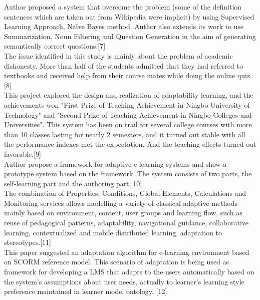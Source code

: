 Author  proposed a system that overcome the problem (some of the definition sentences which are taken out from Wikipedia were implicit) by using Supervised Learning Approach, Naïve Bayes method. Author also extends its work to use Summarization, Noun Filtering and Question Generation in the aim of generating semantically correct questions.[7]\\[0.5cm]
The issue identified in this study is mainly about the problem of academic dishonesty. More than half of the students admitted that they had referred to textbooks and received help from their course mates while doing the online quiz.[8]\\[0.5cm]
This project explored the design and realization of adaptability learning, and the achievements won "First Prize of Teaching Achievement in Ningbo University of Technology" and "Second Prize of Teaching Achievement in Ningbo Colleges and Universities". This system has been on trail for several college courses with more than 10 classes lasting for nearly 2 semesters, and it turned out stable with all the performance indexes met the expectation. And the teaching effects turned out favorable.[9]\\[0.5cm]
Author propose a framework for adaptive e-learning systems and show a prototype system based on the framework. The system consists of two parts, the self-learning part and the authoring part.[10]\\[0.5cm]
The combination of Properties, Conditions, Global Elements, Calculations and Monitoring services allows modelling a variety of classical adaptive methods mainly based on environment, content, user groups and learning flow, such as reuse of pedagogical patterns, adaptability, navigational guidance, collaborative learning, contextualized and mobile distributed learning, adaptation to stereotypes.[11]\\[0.5cm]
This paper suggested an adaptation algorithm for e-learning environment based on SCORM reference model. This scenario of adaptation is being used as framework for developing a LMS that adapts to the users automatically based on the system’s assumptions about user needs, actually to learner’s learning style preference maintained in learner model ontology. [12]\\[0.5cm]
\break

